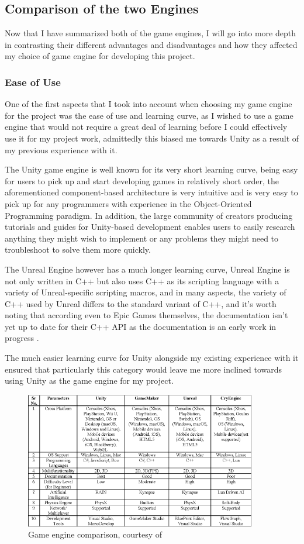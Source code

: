 \subsection{Comparison of the two Engines}
Now that I have summarized both of the game engines, I will go into more depth in contrasting their different advantages and disadvantages and how they affected my choice of game engine for developing this project.
\par
\subsubsection{Ease of Use}
One of the first aspects that I took into account when choosing my game engine for the project was the ease of use and learning curve, as I wished to use a game engine that would not require a great deal of learning before I could effectively use it for my project work, admittedly this biased me towards Unity as a result of my previous experience with it.
\par
The Unity game engine is well known for its very short learning curve, being easy for users to pick up and start developing games in relatively short order, the aforementioned component-based architecture is very intuitive and is very easy to pick up for any programmers with experience in the Object-Oriented Programming paradigm. In addition, the large community of creators producing tutorials and guides for Unity-based development enables users to easily research anything they might wish to implement or any problems they might need to troubleshoot to solve them more quickly.
\par
The Unreal Engine however has a much longer learning curve, Unreal Engine is not only written in C++ but also uses C++ as its scripting language with a variety of Unreal-specific scripting macros, and in many aspects, the variety of C++ used by Unreal differs to the standard variant of C++, and it's worth noting that according even to Epic Games themselves, the documentation isn't yet up to date for their C++ API as the documentation is an early work in progress \cite{UnrealC++}.
\par
The much easier learning curve for Unity alongside my existing experience with it ensured that particularly this category would leave me more inclined towards using Unity as the game engine for my project.
\begin{figure}[ht!]
    \includegraphics[width=0.9\textwidth]{images/GameEngineComparison.png}
    \caption{Game engine comparison, courtesy of \cite{9579618}}
    \label{image:gameEngineComparison}
\end{figure}
